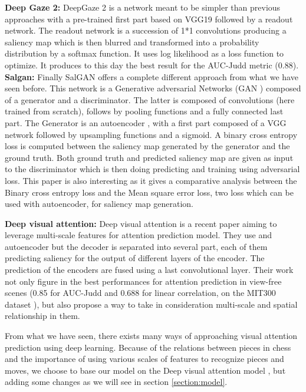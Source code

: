 \textbf{Deep Gaze 2:  }DeepGaze 2 \cite{Kummerer_2017_ICCV} is a network meant to be simpler than previous approaches with a pre-trained first part based on VGG19\cite{DBLP:journals/corr/SimonyanZ14a} followed by a readout network. The readout network is a succession of 1*1 convolutions producing a saliency map which is then blurred and transformed into a probability distribution by a softmax function. It uses log likelihood as a loss function to optimize. It produces to this day the best result for the AUC-Judd metric (0.88).\\

\textbf{Salgan: }Finally SalGAN \cite{DBLP:journals/corr/PanCMOTSN17} offers a complete different approach from what we have seen before. This network is a Generative adversarial Networks (GAN \cite{2014arXiv1406.2661G}) composed of a generator and a discriminator. The latter is composed of convolutions (here trained from scratch), follows by  pooling functions  and a fully connected last part. The Generator is an autoencoder , with a first part composed of a VGG network followed by upsampling functions and  a sigmoid. A binary cross entropy loss is computed between the saliency map generated by the generator and the ground truth. Both ground truth and predicted saliency map are given as input to the discriminator which is then  doing predicting and  training using adversarial loss.
This paper is also interesting as it gives a comparative analysis between the Binary cross entropy loss and the Mean square error loss, two loss which can be used with autoencoder, for saliency map generation.

\textbf{Deep visual attention:  } Deep visual attention \cite{DBLP:journals/corr/WangS17b} is a recent paper aiming to leverage multi-scale features for attention prediction model. They use and autoencoder but the decoder is separated into several part, each of them predicting saliency 
for the output of different layers of the encoder. The prediction of the encoders are fused using a last convolutional layer. Their work not only figure in the best performances for attention prediction in view-free scenes (0.85 for AUC-Judd and 0.688 for linear correlation, on the MIT300 dataset \cite{Judd_2012}), but also propose a way to take in consideration multi-scale and spatial relationship in them.


From what we have seen, there exists many ways of approaching visual attention prediction using deep learning. Because of the relations between pieces in chess and the importance of using various scales of features to recognize pieces and moves, we choose to base our model on the Deep visual attention model \cite{DBLP:journals/corr/WangS17b}, but adding some changes as we will see in section \ref{section:model}.

